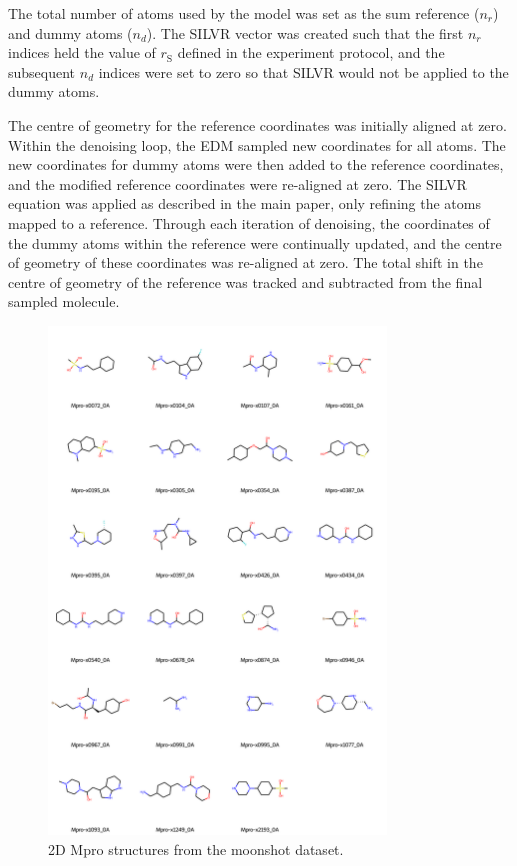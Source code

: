 \documentclass[journal=jacsat,manuscript=article]{achemso}
\begin{document}
\begin{suppinfo}
The total number of atoms used by the model was set as the sum reference ($n_r$) and dummy atoms ($n_d$). The SILVR vector was created such that the first $n_r$ indices held the value of $r_{\mathrm{S}}$ defined in the experiment protocol, and the subsequent $n_d$ indices were set to zero so that SILVR would not be applied to the dummy atoms. 

The centre of geometry for the reference coordinates was initially aligned at zero. Within the denoising loop, the EDM sampled new coordinates for all atoms. The new coordinates for dummy atoms were then added to the reference coordinates, and the modified reference coordinates were re-aligned at zero. The SILVR equation was applied as described in the main paper, only refining the atoms mapped to a reference. Through each iteration of denoising, the coordinates of the dummy atoms within the reference were continually updated, and the centre of geometry of these coordinates was re-aligned at zero. The total shift in the centre of geometry of the reference was tracked and subtracted from the final sampled molecule. 


\begin{figure}
    \centering
    \includegraphics[width=0.8\textwidth]{paper/Figures/FigS1/mpro_ligands_grid_2d.png}
    \caption{2D Mpro structures from the moonshot dataset.}
    \label{fig:moonshot_data}
\end{figure}
\newpage


\end{suppinfo}
\end{document}
